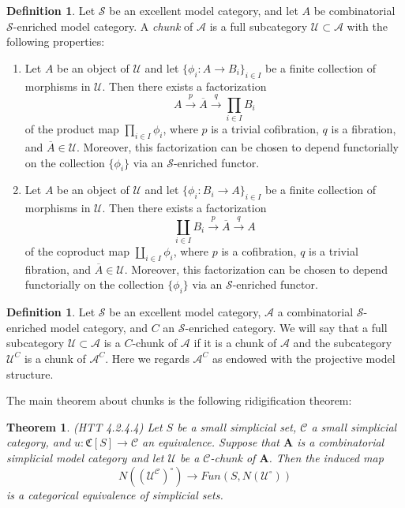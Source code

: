 \documentclass[letterpaper]{article}
\newtheorem{theorem}{Theorem}
\theoremstyle{definition}
\newtheorem{definition}[lemma]{Definition}
\newcommand{\mc}{\mathcal}
\begin{document}
\begin{definition}
Let $\mc S$ be an excellent model category, and let $A$ be combinatorial
$\mc S$-enriched model category. A \emph{chunk} of $\mc A$ is a full
subcategory  $ \mc U \subset \mc A$ with the following properties:
\begin{enumerate}
\item Let $A$ be an object of $\mc U$ and let $\{\phi_i : A
  \rightarrow B_i\}_{i \in I}$ be a finite collection of morphisms in
  $\mc U$. Then there exists a factorization
\[
A \xrightarrow{p} \overline A \xrightarrow{q} \prod_{i \in I} B_i
\]
of the product map $\prod_{i \in I} \phi_i$, where $p$ is a trivial
cofibration, $q$ is a fibration, and $\overline A \in \mc
U$. Moreover, this factorization can be chosen to depend functorially
on the collection $\{\phi_i\}$ via an $\mc S$-enriched functor.
\item Let $A$ be an object of $\mc U$ and let $\{\phi_i : B_i
  \rightarrow A\}_{i \in I}$ be a finite collection of morphisms in
  $\mc U$. Then there exists a factorization
\[
\coprod_{i \in I} B_i \xrightarrow{p} \overline A \xrightarrow{q} A
\]
of the coproduct map $\coprod_{i \in I} \phi_i$, where $p$ is a
cofibration, $q$ is a trivial fibration, and $\overline A \in \mc
U$. Moreover, this factorization can be chosen to depend functorially
on the collection $\{\phi_i\}$ via an $\mc S$-enriched functor. 
\end{enumerate}
\end{definition}

\begin{definition}
Let $\mc S$ be an excellent model category, $\mc A$ a combinatorial
$\mc S$-enriched model category, and $C$ an $\mc S$-enriched
category. We will say that a full subcategory $\mc U \subset \mc A$ is
a $C$-chunk of $\mc A$ if it is a chunk of $\mc A$ and the subcategory
$\mc U^C$ is a chunk of $\mc A^C$. Here we regards $\mc A^C$ as
endowed with the projective model structure. 
\end{definition}

The main theorem about chunks is the following ridigification theorem:

\begin{theorem}(HTT 4.2.4.4)
Let $S$ be a small simplicial set, $\mc C$ a small simplicial
category, and $u : \mathfrak C[S] \rightarrow \mc C$ an
equivalence. Suppose that $\mathbf{A}$ is a combinatorial simplicial
model category and let $\mc U$ be a $\mc C$-chunk of
$\mathbf{A}$. Then the induced map
\[
N((\mc U^{\mc C})^{\circ}) \rightarrow Fun(S,N(\mc U^{\circ}))
\]
is a categorical equivalence of simplicial sets. 
\end{theorem}
\end{document}
